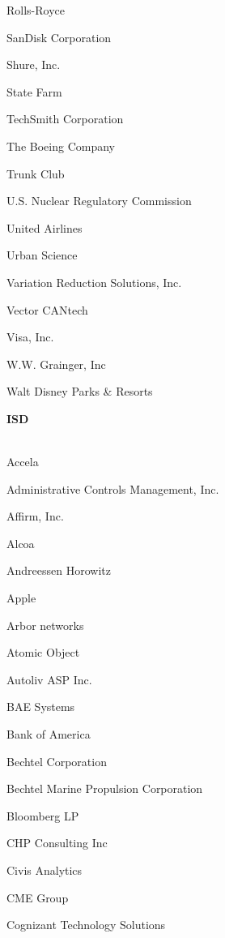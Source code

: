 \documentclass[twoside]{article}
\begin{document}
\begin{center}
\begin{multicols}{5}
\begin{FlushLeft}
\begin{compactitem}
\item Rolls-Royce
\item SanDisk Corporation
\item Shure, Inc.
\item State Farm
\item TechSmith Corporation
\item The Boeing Company
\item Trunk Club
\item U.S. Nuclear Regulatory Commission
\item United Airlines
\item Urban Science
\item Variation Reduction Solutions, Inc.
\item Vector CANtech
\item Visa, Inc.
\item W.W. Grainger, Inc
\item Walt Disney Parks \& Resorts
\end{compactitem}
        \end{FlushLeft}
        \vspace{1em}
        {\fontsize{14}{16}\selectfont \bf ISD}\\
        \vspace{-1em}
        ~\hrulefill~
        \vspace{-.9em}
        \begin{FlushLeft}
        \begin{compactitem}
        \item Accela
\item Administrative Controls Management, Inc.
\item Affirm, Inc.
\item Alcoa
\item Andreessen Horowitz
\item Apple
\item Arbor networks
\item Atomic Object
\item Autoliv ASP Inc.
\item BAE Systems
\item Bank of America
\item Bechtel Corporation
\item Bechtel Marine Propulsion Corporation
\item Bloomberg LP
\item CHP Consulting Inc
\item Civis Analytics
\item CME Group
\item Cognizant Technology Solutions

\end{compactitem}
\end{FlushLeft}
\end{multicols}
\end{center}
\end{document}
